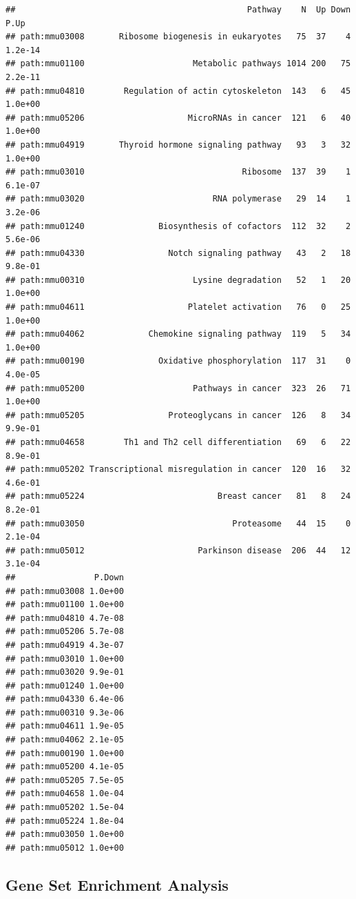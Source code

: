 \documentclass[]{book}
\begin{document}
\begin{verbatim}
##                                               Pathway    N  Up Down    P.Up
## path:mmu03008       Ribosome biogenesis in eukaryotes   75  37    4 1.2e-14
## path:mmu01100                      Metabolic pathways 1014 200   75 2.2e-11
## path:mmu04810        Regulation of actin cytoskeleton  143   6   45 1.0e+00
## path:mmu05206                     MicroRNAs in cancer  121   6   40 1.0e+00
## path:mmu04919       Thyroid hormone signaling pathway   93   3   32 1.0e+00
## path:mmu03010                                Ribosome  137  39    1 6.1e-07
## path:mmu03020                          RNA polymerase   29  14    1 3.2e-06
## path:mmu01240               Biosynthesis of cofactors  112  32    2 5.6e-06
## path:mmu04330                 Notch signaling pathway   43   2   18 9.8e-01
## path:mmu00310                      Lysine degradation   52   1   20 1.0e+00
## path:mmu04611                     Platelet activation   76   0   25 1.0e+00
## path:mmu04062             Chemokine signaling pathway  119   5   34 1.0e+00
## path:mmu00190               Oxidative phosphorylation  117  31    0 4.0e-05
## path:mmu05200                      Pathways in cancer  323  26   71 1.0e+00
## path:mmu05205                 Proteoglycans in cancer  126   8   34 9.9e-01
## path:mmu04658        Th1 and Th2 cell differentiation   69   6   22 8.9e-01
## path:mmu05202 Transcriptional misregulation in cancer  120  16   32 4.6e-01
## path:mmu05224                           Breast cancer   81   8   24 8.2e-01
## path:mmu03050                              Proteasome   44  15    0 2.1e-04
## path:mmu05012                       Parkinson disease  206  44   12 3.1e-04
##                P.Down
## path:mmu03008 1.0e+00
## path:mmu01100 1.0e+00
## path:mmu04810 4.7e-08
## path:mmu05206 5.7e-08
## path:mmu04919 4.3e-07
## path:mmu03010 1.0e+00
## path:mmu03020 9.9e-01
## path:mmu01240 1.0e+00
## path:mmu04330 6.4e-06
## path:mmu00310 9.3e-06
## path:mmu04611 1.9e-05
## path:mmu04062 2.1e-05
## path:mmu00190 1.0e+00
## path:mmu05200 4.1e-05
## path:mmu05205 7.5e-05
## path:mmu04658 1.0e-04
## path:mmu05202 1.5e-04
## path:mmu05224 1.8e-04
## path:mmu03050 1.0e+00
## path:mmu05012 1.0e+00
\end{verbatim}

\hypertarget{gene-set-enrichment-analysis}{%
\subsection{Gene Set Enrichment Analysis}\label{gene-set-enrichment-analysis}}
\end{document}
